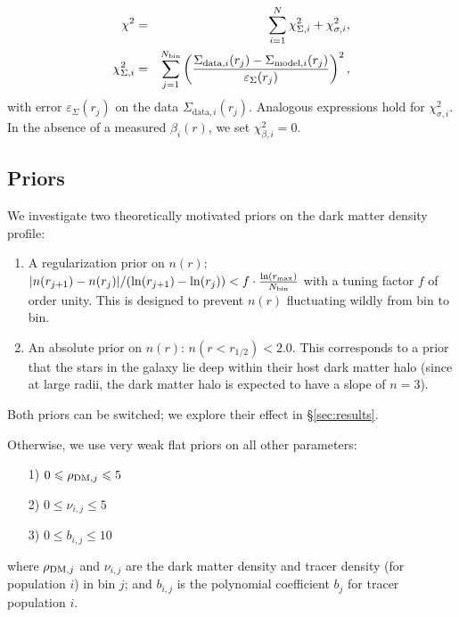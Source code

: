 \begin{eqnarray}
    \chi^2 &=& \sum_{i=1}^N \chi_{\Sigma,i}^2 + \chi_{\sigma,i}^2,\\
    \chi_{\Sigma,i}^2 &=& \sum_{j=1}^{N_{\rm bin}} \left(\frac{\Sigma_{\text{data},i}(r_j)-\Sigma_{\text{model},i}(r_j)}{\varepsilon_\Sigma(r_j)}\right)^2,
\end{eqnarray}
with error $\varepsilon_\Sigma(r_j)$ on the data
$\Sigma_{\text{data},i}(r_j)$. Analogous expressions hold for
$\chi_{\sigma,i}^2$. In the absence of a
measured $\beta_i(r)$, we set $\chi_{\beta,i}^2=0$.

\subsection{Priors}

We investigate two theoretically motivated priors on the dark matter density
profile:

\begin{enumerate}
    \item A regularization prior on $n(r)$:
    $|n(r_{j+1})-n(r_{j})|/(\ln(r_{j+1})-\ln(r_{j}))<f\cdot\frac{\ln(r_{\rm
        max})}{N_{\rm bin}}$ with a tuning factor $f$ of order
    unity. This is designed to prevent $n(r)$ fluctuating wildly from bin to bin.

    \item An absolute prior on $n(r)$: $n(r<r_{1/2})<2.0$. This corresponds to a
    prior that the stars in the galaxy lie deep within their host dark matter
    halo (since at large radii, the dark matter halo is expected to have a slope
    of $n = 3$).
\end{enumerate}
Both priors can be switched; we explore their effect in \S\ref{sec:results}.

Otherwise, we use very weak flat priors on all other parameters:

\begin{enumerate}
    \item[1)] $0\leq \rho_{{\rm DM},j} \leq 5$
    \item[2)] $0\leq \nu_{i,j}  \leq 5$
    \item[3)] $0\leq b_{i,j} \leq 10$
\end{enumerate}
where $\rho_{{\rm DM},j}$ and $\nu_{i,j}$ are the dark matter density and tracer
density (for population $i$) in bin $j$; and $b_{i,j}$ is the polynomial
coefficient $b_j$ for tracer population $i$.

%
%
%

